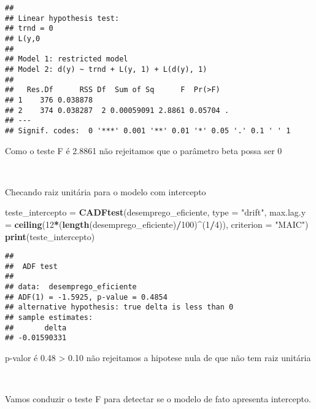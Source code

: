 \documentclass[
]{article}
\newenvironment{Shaded}{\begin{snugshade}}{\end{snugshade}}
\newcommand{\AttributeTok}[1]{\textcolor[rgb]{0.13,0.29,0.53}{#1}}
\newcommand{\DecValTok}[1]{\textcolor[rgb]{0.00,0.00,0.81}{#1}}
\newcommand{\FunctionTok}[1]{\textcolor[rgb]{0.13,0.29,0.53}{\textbf{#1}}}
\newcommand{\NormalTok}[1]{#1}
\newcommand{\OtherTok}[1]{\textcolor[rgb]{0.56,0.35,0.01}{#1}}
\newcommand{\SpecialCharTok}[1]{\textcolor[rgb]{0.81,0.36,0.00}{\textbf{#1}}}
\newcommand{\StringTok}[1]{\textcolor[rgb]{0.31,0.60,0.02}{#1}}
\begin{document}
\begin{verbatim}
## 
## Linear hypothesis test:
## trnd = 0
## L(y,0
## 
## Model 1: restricted model
## Model 2: d(y) ~ trnd + L(y, 1) + L(d(y), 1)
## 
##   Res.Df      RSS Df  Sum of Sq      F  Pr(>F)  
## 1    376 0.038878                               
## 2    374 0.038287  2 0.00059091 2.8861 0.05704 .
## ---
## Signif. codes:  0 '***' 0.001 '**' 0.01 '*' 0.05 '.' 0.1 ' ' 1
\end{verbatim}

Como o teste F é 2.8861 não rejeitamos que o parâmetro beta possa ser 0

~

Checando raiz unitária para o modelo com intercepto

\begin{Shaded}
\begin{Highlighting}[]
\NormalTok{teste\_intercepto }\OtherTok{=} \FunctionTok{CADFtest}\NormalTok{(desemprego\_eficiente, }\AttributeTok{type =} \StringTok{"drift"}\NormalTok{, }\AttributeTok{max.lag.y =} \FunctionTok{ceiling}\NormalTok{(}\DecValTok{12}\SpecialCharTok{*}\NormalTok{(}\FunctionTok{length}\NormalTok{(desemprego\_eficiente)}\SpecialCharTok{/}\DecValTok{100}\NormalTok{)}\SpecialCharTok{\^{}}\NormalTok{(}\DecValTok{1}\SpecialCharTok{/}\DecValTok{4}\NormalTok{)), }
                 \AttributeTok{criterion =} \StringTok{"MAIC"}\NormalTok{)}
\FunctionTok{print}\NormalTok{(teste\_intercepto)}
\end{Highlighting}
\end{Shaded}

\begin{verbatim}
## 
##  ADF test
## 
## data:  desemprego_eficiente
## ADF(1) = -1.5925, p-value = 0.4854
## alternative hypothesis: true delta is less than 0
## sample estimates:
##       delta 
## -0.01590331
\end{verbatim}

p-valor é 0.48 \textgreater{} 0.10 não rejeitamos a hipotese nula de que
não tem raiz unitária

~

Vamos conduzir o teste F para detectar se o modelo de fato apresenta
intercepto.

\begin{Shaded}
\end{Shaded}
\end{document}
